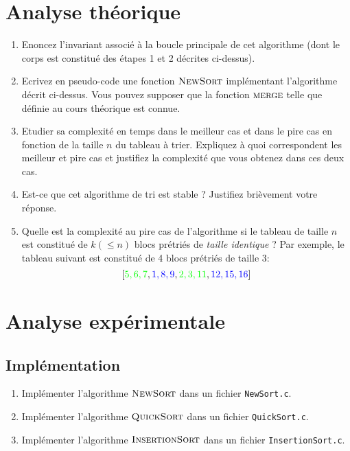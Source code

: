 \documentclass[a4paper,10pt]{article}
\begin{document}
\bigskip

\section{Analyse théorique}
\begin{enumerate}
\item Enoncez l'invariant associé à la boucle principale de cet
  algorithme (dont le corps est constitué des étapes 1 et 2 décrites
  ci-dessus).
\item Ecrivez en pseudo-code une fonction $\textnormal{\scshape NewSort}$
  implémentant l'algorithme décrit ci-dessus. Vous pouvez supposer que la fonction
  $\textnormal{\scshape merge}$ telle que définie au cours théorique est connue.
\item Etudier sa complexité en temps dans le meilleur cas et dans le
  pire cas en fonction de la taille $n$ du tableau à trier. Expliquez
  à quoi correspondent les meilleur et pire cas et justifiez la
  complexité que vous obtenez dans ces deux cas.
\item Est-ce que cet algorithme de tri est stable ? Justifiez brièvement votre réponse.
\item Quelle est
  la complexité au pire cas de l'algorithme si le tableau de taille $n$ est
  constitué de $k (\leq n)$ blocs prétriés de {\it taille identique} ? Par exemple, le tableau
  suivant est constitué de 4 blocs prétriés de taille 3:
$$[{\color{green} 5,6,7},{\color{blue}1,8,9},{\color{green}2,3,11},{\color{blue}12,15,16}]$$
\end{enumerate}

\section{Analyse expérimentale}

\subsection{Implémentation}

\begin{enumerate}
\item Implémenter l'algorithme $\textnormal{\scshape NewSort}$ dans un fichier \texttt{NewSort.c}.
\item Implémenter l'algorithme $\textnormal{\scshape QuickSort}$ dans un fichier \texttt{QuickSort.c}.
\item Implémenter l'algorithme $\textnormal{\scshape InsertionSort}$ dans un fichier \texttt{InsertionSort.c}.
\end{enumerate}
\end{document}
